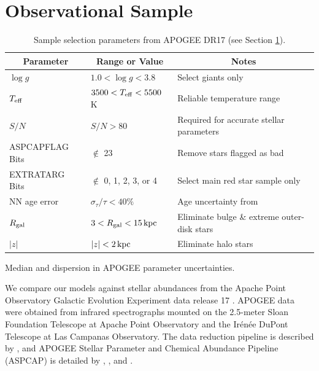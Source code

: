 \documentclass[twocolumn,twocolappendix,linenumbers]{aastex631}
\newcommand{\kpc}{\,{\rm kpc}}
\begin{document}
\section{Observational Sample}
\label{sec:observational-sample}

\begin{table}
    \centering
    \caption{Sample selection parameters from APOGEE DR17 (see Section \ref{sec:observational-sample}).}
    \label{tab:sample}
    \begin{tabular}{lll}
        \hline\hline
        \multicolumn{1}{c}{Parameter} & \multicolumn{1}{c}{Range or Value} & \multicolumn{1}{c}{Notes} \\
        \hline
        $\log g$            & $1.0 < \log g < 3.8$          & Select giants only \\
        $T_{\rm eff}$       & $3500 < T_{\rm eff} < 5500$ K & Reliable temperature range \\
        $S/N$               & $S/N > 80$                    & Required for accurate stellar parameters \\
        ASPCAPFLAG Bits     & $\notin$ 23                   & Remove stars flagged as bad \\
        EXTRATARG Bits      & $\notin$ 0, 1, 2, 3, or 4     & Select main red star sample only \\
        NN age error        & $\sigma_\tau/\tau < 40\%$     & Age uncertainty from \citet{leung_variational_2023} \\
        $R_{\rm gal}$     & $3 < R_{\rm gal} < 15\kpc$    & Eliminate bulge \& extreme outer-disk stars \\
        $|z|$               & $|z| < 2\kpc$                 & Eliminate halo stars \\
        \hline
    \end{tabular}
\end{table}

\begin{table}
    \centering
    \caption{Median and dispersion in APOGEE parameter uncertainties.}
    \label{tab:uncertainties}
    
\end{table}

We compare our models against stellar abundances from the Apache Point Observatory Galactic Evolution Experiment \citep[APOGEE;][]{majewski_apache_2017} data release 17 \citep[DR17;][]{abdurrouf_seventeenth_2022}. APOGEE data were obtained from infrared spectrographs \citep{wilson_apache_2019} mounted on the 2.5-meter Sloan Foundation Telescope \citep{gunn_25_2006} at Apache Point Observatory and the Ir{\'e}n{\'e}e DuPont Telescope \citep{bowen_optical_1973} at Las Campanas Observatory. The data reduction pipeline is described by \citet{nidever_data_2015}, and APOGEE Stellar Parameter and Chemical Abundance Pipeline (ASPCAP) is detailed by \citet{holtzman_abundances_2015}, \citet{garcia_perez_aspcap_2016}, and \citet{jonsson_apogee_2020}.
\end{document}

